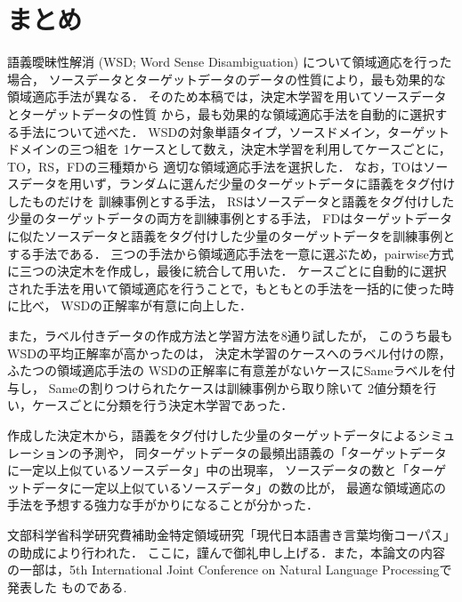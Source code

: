 \documentclass[japanese]{jnlp_1.4}
\begin{document}
\section{まとめ} \label{Sec:まとめ}

語義曖昧性解消 (WSD; Word Sense Disambiguation) について領域適応を行った場合，
ソースデータとターゲットデータのデータの性質により，最も効果的な領域適応手法が異なる．
そのため本稿では，決定木学習を用いてソースデータとターゲットデータの性質
から，最も効果的な領域適応手法を自動的に選択する手法について述べた．
WSDの対象単語タイプ，ソースドメイン，ターゲットドメインの三つ組を
1ケースとして数え，決定木学習を利用してケースごとに，
TO，RS，FDの三種類から
適切な領域適応手法を選択した．
なお，TOはソースデータを用いず，ランダムに選んだ少量のターゲットデータに語義をタグ付けしたものだけを
訓練事例とする手法，
RSはソースデータと語義をタグ付けした少量のターゲットデータの両方を訓練事例とする手法，
FDはターゲットデータに似たソースデータと語義をタグ付けした少量のターゲットデータを訓練事例とする手法である．
三つの手法から領域適応手法を一意に選ぶため，pairwise方式に三つの決定木を作成し，最後に統合して用いた．
ケースごとに自動的に選択された手法を用いて領域適応を行うことで，もともとの手法を一括的に使った時に比べ，
WSDの正解率が有意に向上した．

また，ラベル付きデータの作成方法と学習方法を8通り試したが，
このうち最もWSDの平均正解率が高かったのは，
決定木学習のケースへのラベル付けの際，ふたつの領域適応手法の
WSDの正解率に有意差がないケースにSameラベルを付与し，
Sameの割りつけられたケースは訓練事例から取り除いて
2値分類を行い，ケースごとに分類を行う決定木学習であった．

作成した決定木から，語義をタグ付けした少量のターゲットデータによるシミュレーションの予測や，
同ターゲットデータの最頻出語義の「ターゲットデータに一定以上似ているソースデータ」中の出現率，
ソースデータの数と「ターゲットデータに一定以上似ているソースデータ」の数の比が，
最適な領域適応の手法を予想する強力な手がかりになることが分かった．

\acknowledgment

文部科学省科学研究費補助金特定領域研究「現代日本語書き言葉均衡コーパス」の助成により行われた．
ここに，謹んで御礼申し上げる．また，本論文の内容の一部は，5th International Joint Conference on Natural Language Processingで発表した
ものである\cite{article22}.
\end{document}
